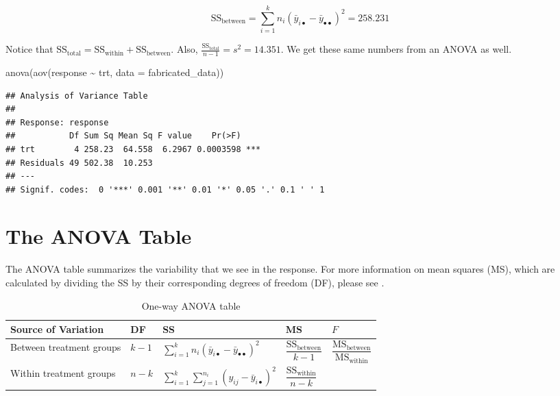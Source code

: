 \documentclass[
]{book}
\newenvironment{Shaded}{\begin{snugshade}}{\end{snugshade}}
\newcommand{\AttributeTok}[1]{\textcolor[rgb]{0.77,0.63,0.00}{#1}}
\newcommand{\FunctionTok}[1]{\textcolor[rgb]{0.00,0.00,0.00}{#1}}
\newcommand{\NormalTok}[1]{#1}
\newcommand{\SpecialCharTok}[1]{\textcolor[rgb]{0.00,0.00,0.00}{#1}}
\begin{document}
\[\text{SS}_{\text{between}} = \sum_{i=1}^{k} n_i\left( \bar{y}_{i \bullet} - \bar{y}_{\bullet\bullet} \right)^2 = 258.231\]

Notice that \(\text{SS}_{\text{total}} = \text{SS}_{\text{within}} + \text{SS}_{\text{between}}\). Also, \(\frac{\text{SS}_{\text{total}}}{n - 1} = s^2 = 14.351\). We get these same numbers from an ANOVA as well.

\begin{Shaded}
\begin{Highlighting}[]
\FunctionTok{anova}\NormalTok{(}\FunctionTok{aov}\NormalTok{(response }\SpecialCharTok{\textasciitilde{}}\NormalTok{ trt, }\AttributeTok{data =}\NormalTok{ fabricated\_data))}
\end{Highlighting}
\end{Shaded}

\begin{verbatim}
## Analysis of Variance Table
## 
## Response: response
##           Df Sum Sq Mean Sq F value    Pr(>F)    
## trt        4 258.23  64.558  6.2967 0.0003598 ***
## Residuals 49 502.38  10.253                      
## ---
## Signif. codes:  0 '***' 0.001 '**' 0.01 '*' 0.05 '.' 0.1 ' ' 1
\end{verbatim}

\hypertarget{the-anova-table}{%
\section{The ANOVA Table}\label{the-anova-table}}

The ANOVA table summarizes the variability that we see in the response. For more information on mean squares (MS), which are calculated by dividing the SS by their corresponding degrees of freedom (DF), please see \autocite{MS-Interpretation}.

\begin{table}[H]
\caption{One-way ANOVA table}
\begin{tabular}{M{0.15\textwidth} l l l l}
\toprule
Source of Variation & DF & SS & MS & \(F\) \\
\midrule
Between treatment groups & \(k - 1\) & \(\sum_{i=1}^{k} n_i\left( \bar{y}_{i \bullet} - \bar{y}_{\bullet\bullet} \right)^2\) & \(\dfrac{\text{SS}_{\text{between}}}{k - 1}\) & \(\dfrac{\text{MS}_{\text{between}}}{\text{MS}_{\text{within}}}\) \\
\addlinespace[0.5cm]
Within treatment groups & \(n - k\) & \(\sum_{i=1}^{k} \sum_{j = 1}^{n_i} \left(y_{ij} - \bar{y}_{i \bullet} \right)^2\) & \(\dfrac{\text{SS}_{\text{within}}}{n - k}\) \\
\bottomrule
\end{tabular}
\end{table}
\end{document}
